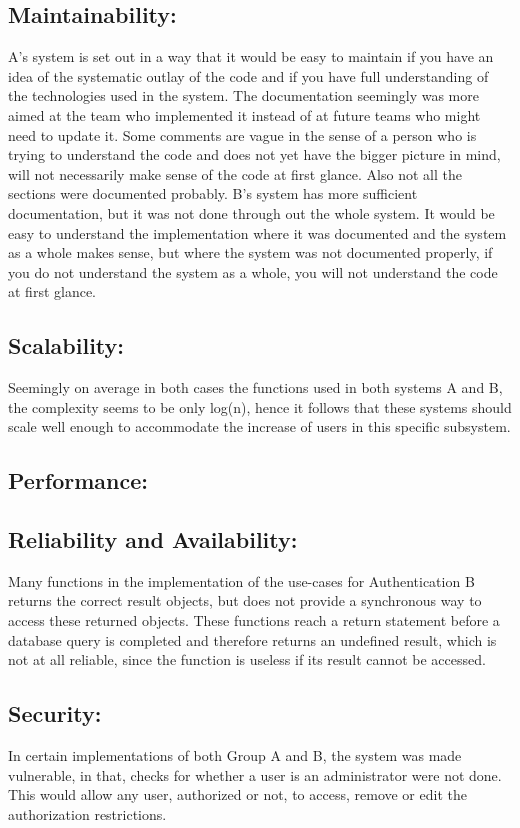 \subsection{Maintainability:}
A's system is set out in a way that it would be easy to maintain if you have an idea of the systematic outlay of the code and if you have full understanding of the technologies used in the system. The documentation seemingly was more aimed at the team who implemented it instead of at future teams who might need to update it. Some comments are vague in the sense of a person who is trying to understand the code and does not yet have the bigger picture in mind, will not necessarily make sense of the code at first glance. Also not all the sections were documented probably.
B's system has more sufficient documentation, but it was not done through out the whole system. It would be easy to understand the implementation where it was documented and the system as a whole makes sense, but where the system was not documented properly, if you do not understand the system as a whole, you will not understand the code at first glance. 

\subsection{Scalability:}
Seemingly on average in both cases the functions used in both systems A and B, the complexity seems to be only log(n), hence it follows that these systems should scale well enough to accommodate the increase of users in this specific subsystem. 

\subsection{Performance:}

\subsection{Reliability and Availability:}
Many functions in the implementation of the use-cases for Authentication B returns the correct result objects, but does not provide a synchronous way to access these returned objects. These functions reach a return statement before a database query is completed and therefore returns an undefined result, which is not at all reliable, since the function is useless if its result cannot be accessed.

\subsection{Security:}
In certain implementations of both  Group A and B, the system was made vulnerable, in that, checks for whether a user is an administrator were not done. This would allow any user, authorized or not, to access, remove or edit the authorization restrictions.

